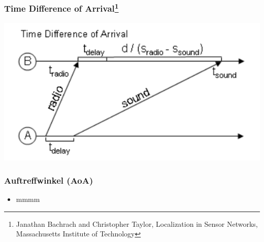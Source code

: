 \begin{frame}
\frametitle{Time Difference of Arrival\footnote{Janathan Bachrach and Christopher Taylor, Localization in Sensor Networks, Massachusetts Institute of Technology}}
  \begin{center}
    \includegraphics[scale=0.5]{img/tdoa1.png}
  \end{center}
\end{frame}

\begin{frame}
\frametitle{Auftreffwinkel (AoA)}

\begin{itemize}
  \item mmmm
\end{itemize}
\end{frame}

